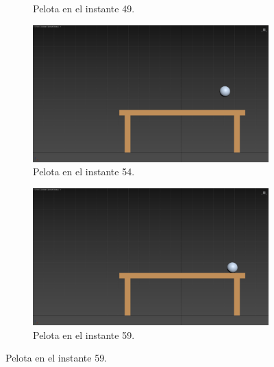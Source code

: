 \documentclass{article}
\begin{document}
\begin{figure}[H]
\begin{subfigure}[H]{0.48\textwidth}
        \caption{Pelota en el instante 49.}
    \end{subfigure}
    \par\bigskip
    \begin{subfigure}[H]{0.48\textwidth}
        \centering
        \includegraphics[width=\textwidth]{imagenes/Ejercicio3/keyframes/54.png}
        \caption{Pelota en el instante 54.}
    \end{subfigure}
    \hfill
    \begin{subfigure}[H]{0.48\textwidth}
        \centering
        \includegraphics[width=\textwidth]{imagenes/Ejercicio3/keyframes/59.png}
        \caption{Pelota en el instante 59.}
    \end{subfigure}
\end{figure}
\end{document}
